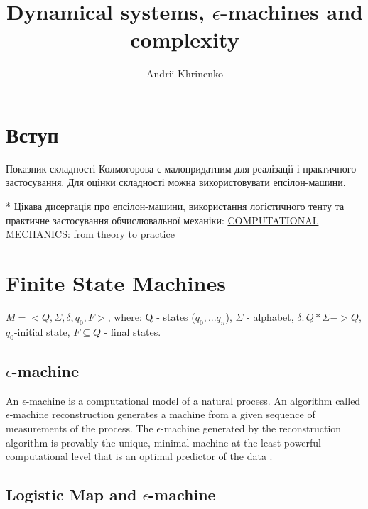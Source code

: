 \documentclass[16pt]{article}
\title{ Dynamical systems, $\epsilon$-machines and complexity }
\author{ Andrii Khrinenko }
\date{}
\begin{document}
	\maketitle	

\section{Вступ}

Показник складності Колмогорова є малопридатним для реалізації і практичного застосування. Для оцінки складності можна використовувати епсілон-машини.

* Цікава дисертація про епсілон-машини, використання логістичного тенту та практичне застосування обчислювальної механіки: \href{https://amslaurea.unibo.it/15649/1/mattia_barbaresi_tesi.pdf}{COMPUTATIONAL MECHANICS: from theory to practice} 

\section{Finite State Machines}

\( M=<Q,\Sigma,\delta,q_0,F> \), where: Q - states (\(q_0,...q_n\)), $\Sigma$ - alphabet, \(\delta:Q*\Sigma->Q\), $q_0$-initial state, \(F\subseteq Q\) - final states.

\subsection{$\epsilon$-machine}

An $\epsilon$-machine is a computational model of a natural process. An algorithm called $\epsilon$-machine reconstruction generates a machine from a given sequence of measurements of the process. The $\epsilon$-machine generated by the reconstruction algorithm is provably the unique, minimal machine at the least-powerful computational level that is an optimal predictor of the data \cite{shalizi2001computational}.

\subsection{Logistic Map and $\epsilon$-machine}





\end{document}
